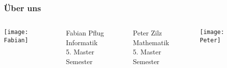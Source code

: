 \begin{frame}
    \frametitle{Über uns}
	\begin{columns}
		\begin{column}{0.25\textwidth}
			\texttt{[image: Fabian]}
		\end{column}
		\begin{column}{0.25\textwidth}
		\begin{flushleft}
			Fabian Pflug\\

			Informatik\\

			5. Master Semester\\
		\end{flushleft}
		\end{column}
		\begin{column}{0.25\textwidth}
		\begin{flushright}
			Peter Zilz\\

			Mathematik\\

			5. Master Semester\\
		\end{flushright}
		\end{column}
		\begin{column}{0.25\textwidth}
			\texttt{[image: Peter]}
		\end{column}
	\end{columns}
\end{frame}

